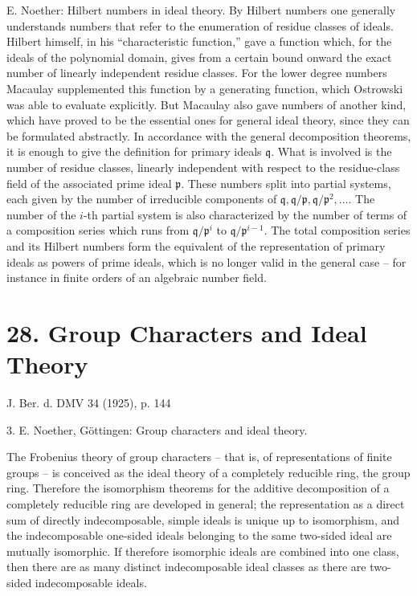 \documentclass[11pt]{article}
\begin{document}
E. Noether: Hilbert numbers in ideal theory. By Hilbert numbers one generally understands numbers that refer to the enumeration of residue classes of ideals. Hilbert himself, in his ``characteristic function,'' gave a function which, for the ideals of the polynomial domain, gives from a certain bound onward the exact number of linearly independent residue classes. For the lower degree numbers Macaulay supplemented this function by a generating function, which Ostrowski was able to evaluate explicitly. But Macaulay also gave numbers of another kind, which have proved to be the essential ones for general ideal theory, since they can be formulated abstractly. In accordance with the general decomposition theorems, it is enough to give the definition for primary ideals $\mathfrak q$. What is involved is the number of residue classes, linearly independent with respect to the residue-class field of the associated prime ideal $\mathfrak p$. These numbers split into partial systems, each given by the number of irreducible components of $\mathfrak q,\mathfrak q/\mathfrak p,\mathfrak q/\mathfrak p^2,\ldots$. The number of the $i$-th partial system is also characterized by the number of terms of a composition series which runs from $\mathfrak q/\mathfrak p^i$ to $\mathfrak q/\mathfrak p^{i-1}$. The total composition series and its Hilbert numbers form the equivalent of the representation of primary ideals as powers of prime ideals, which is no longer valid in the general case -- for instance in finite orders of an algebraic number field.

\section*{28. Group Characters and Ideal Theory}

\begin{center}
J. Ber. d. DMV 34 (1925), p. 144
\end{center}

3. E. Noether, Göttingen: Group characters and ideal theory.

The Frobenius theory of group characters -- that is, of representations of finite groups -- is conceived as the ideal theory of a completely reducible ring, the group ring. Therefore the isomorphism theorems for the additive decomposition of a completely reducible ring are developed in general; the representation as a direct sum of directly indecomposable, simple ideals is unique up to isomorphism, and the indecomposable one-sided ideals belonging to the same two-sided ideal are mutually isomorphic. If therefore isomorphic ideals are combined into one class, then there are as many distinct indecomposable ideal classes as there are two-sided indecomposable ideals.
\end{document}
